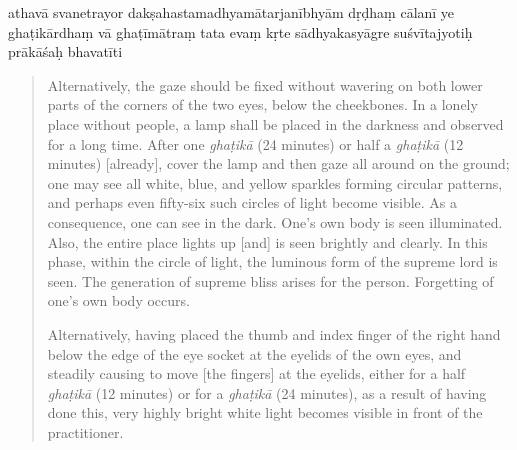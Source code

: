 \begin{itquote}
\begin{ekdosis}
athavā svanetrayor
dakṣahastamadhyamātarjanībhyām
dṛḍhaṃ cālanī ye ghaṭikārdhaṃ vā ghaṭīmātraṃ tata  evaṃ kṛte sādhyakasyāgre suśvītajyotiḥ prākāśaḥ
bhavatīti \normalpipe
{}
\end{ekdosis}
\end{itquote}
\begin{quote}
  Alternatively, the gaze should be fixed without wavering on both lower parts of the corners of the two eyes, below the cheekbones. In a lonely place without people, a lamp shall be placed in the darkness and observed for a long time. After one \textit{ghaṭikā} (24 minutes) or half a \textit{ghaṭikā} (12 minutes) [already], cover the lamp and then gaze all around on the ground; one may see all white, blue, and yellow sparkles forming circular patterns, and perhaps even fifty-six such circles of light become visible. As a consequence, one can see in the dark. One’s own body is seen illuminated. Also, the entire place lights up [and] is seen brightly and clearly. In this phase, within the circle of light, the luminous form of the supreme lord is seen. The generation of supreme bliss arises for the person. Forgetting of one’s own body occurs.
  
  Alternatively, having placed the thumb and index finger of the right hand below the edge of the eye socket at the eyelids of the own eyes, and steadily causing to move [the fingers] at the eyelids, either for a half \textit{ghaṭikā} (12 minutes) or for a \textit{ghaṭikā} (24 minutes), as a result of having done this, very highly bright white light becomes visible in front of the practitioner.
\end{quote} 

